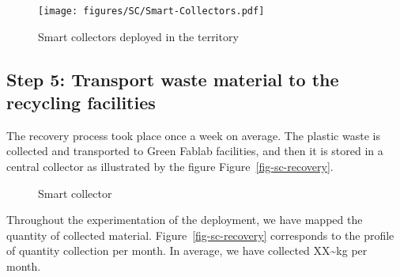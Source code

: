 \documentclass[
  11pt,
]{article}
\begin{document}
\begin{figure}[H]

{\centering \texttt{[image: figures/SC/Smart-Collectors.pdf]}

}

\caption{\label{fig-sc-flyer}Smart collectors deployed in the territory}

\end{figure}

\hypertarget{step-5-transport-waste-material-to-the-recycling-facilities}{%
\subsection{Step 5: Transport waste material to the recycling
facilities}\label{step-5-transport-waste-material-to-the-recycling-facilities}}

The recovery process took place once a week on average. The plastic
waste is collected and transported to Green Fablab facilities, and then
it is stored in a central collector as illustrated by the figure
Figure~\ref{fig-sc-recovery}.

\begin{figure}

\begin{minipage}[t]{0.50\linewidth}

{\centering 


}

\end{minipage}%
%
\begin{minipage}[t]{0.50\linewidth}

{\centering 


}

\end{minipage}%

\caption{\label{fig-sc-collector}Smart collector}

\end{figure}

Throughout the experimentation of the deployment, we have mapped the
quantity of collected material. Figure~\ref{fig-sc-recovery} corresponds
to the profile of quantity collection per month. In average, we have
collected XX\textasciitilde kg per month.
\end{document}
